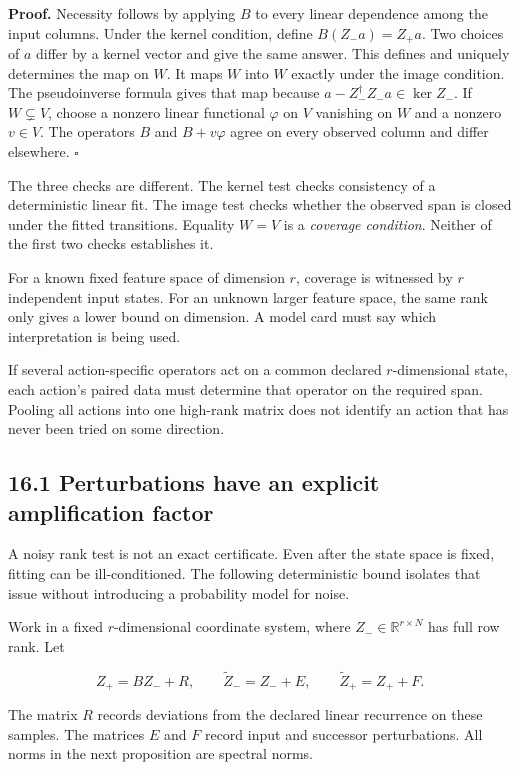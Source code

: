 \documentclass[11pt,letterpaper]{article}
\begin{document}
\textbf{Proof.} Necessity follows by applying \(B\) to every linear
dependence among the input columns. Under the kernel condition, define
\(B(Z_-a)=Z_+a\). Two choices of \(a\) differ by a kernel vector and
give the same answer. This defines and uniquely determines the map on
\(W\). It maps \(W\) into \(W\) exactly under the image condition. The
pseudoinverse formula gives that map because
\(a-Z_-^\dagger Z_-a\in\ker Z_-\). If \(W\subsetneq V\), choose a
nonzero linear functional \(\varphi\) on \(V\) vanishing on \(W\) and a
nonzero \(v\in V\). The operators \(B\) and \(B+v\varphi\) agree on
every observed column and differ elsewhere. \(\square\)

The three checks are different. The kernel test checks consistency of a
deterministic linear fit. The image test checks whether the observed
span is closed under the fitted transitions. Equality \(W=V\) is a
\emph{coverage condition}. Neither of the first two checks establishes
it.

For a known fixed feature space of dimension \(r\), coverage is
witnessed by \(r\) independent input states. For an unknown larger
feature space, the same rank only gives a lower bound on dimension. A
model card must say which interpretation is being used.

If several action-specific operators act on a common declared
\(r\)-dimensional state, each action's paired data must determine that
operator on the required span. Pooling all actions into one high-rank
matrix does not identify an action that has never been tried on some
direction.

\subsection{16.1 Perturbations have an explicit amplification
factor}\label{perturbations-have-an-explicit-amplification-factor}

A noisy rank test is not an exact certificate. Even after the state
space is fixed, fitting can be ill-conditioned. The following
deterministic bound isolates that issue without introducing a
probability model for noise.

Work in a fixed \(r\)-dimensional coordinate system, where
\(Z_-\in\mathbb R^{r\times N}\) has full row rank. Let

\[
Z_+=BZ_-+R,\qquad
\widetilde Z_-=Z_-+E,\qquad
\widetilde Z_+=Z_++F.
\]

The matrix \(R\) records deviations from the declared linear recurrence
on these samples. The matrices \(E\) and \(F\) record input and
successor perturbations. All norms in the next proposition are spectral
norms.
\end{document}

